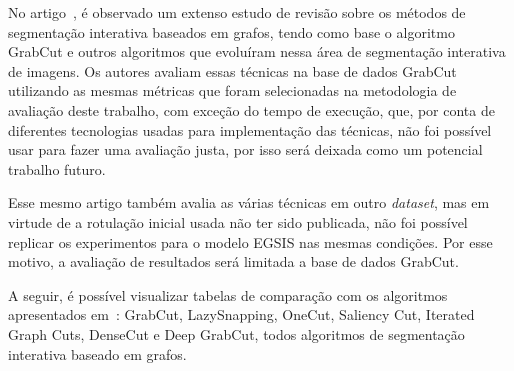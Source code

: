 No artigo~\cite{wang2023review}, é observado um extenso estudo de
revisão sobre os métodos de segmentação interativa baseados em grafos,
tendo como base o algoritmo GrabCut e outros algoritmos que evoluíram
nessa área de segmentação interativa de imagens. Os autores avaliam
essas técnicas na base de dados GrabCut~\cite{rother2004grabcut}
utilizando as mesmas métricas que foram selecionadas na metodologia de
avaliação deste trabalho, com exceção do tempo de execução, que, por
conta de diferentes tecnologias usadas para implementação das
técnicas, não foi possível usar para fazer uma avaliação justa, por
isso será deixada como um potencial trabalho futuro.

Esse mesmo artigo também avalia as várias técnicas em outro
\textit{dataset}, mas em virtude de a rotulação inicial usada não ter
sido publicada, não foi possível replicar os experimentos para o
modelo \gls{EGSIS} nas mesmas condições. Por esse motivo, a avaliação
de resultados será limitada a base de dados GrabCut.

A seguir, é possível visualizar tabelas de comparação com os
algoritmos apresentados em~\cite{wang2023review}: GrabCut,
LazySnapping, OneCut, Saliency Cut, Iterated Graph Cuts, DenseCut e
Deep GrabCut, todos algoritmos de segmentação interativa baseado em grafos.


